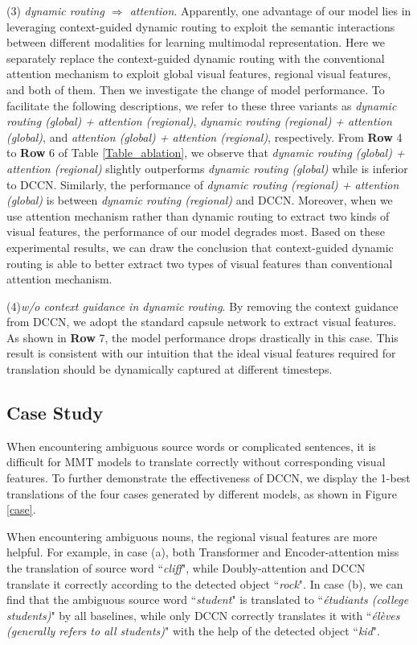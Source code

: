 \documentclass[sigconf]{acmart}
\begin{document}
(3) \emph{dynamic routing $\Rightarrow$ attention}. 
Apparently, one advantage of our model lies in leveraging context-guided dynamic routing to exploit the semantic interactions between different modalities for learning multimodal representation. Here we separately replace the context-guided dynamic routing with the conventional attention mechanism to exploit global visual features, regional visual features, and both of them. Then we investigate the change of model performance. 
To facilitate the following descriptions, we refer to these three variants as 
\emph{dynamic routing (global) + attention (regional)}, 
\emph{dynamic routing (regional) + attention (global)}, 
and \emph{attention (global) + attention (regional)}, respectively. 
From \textbf{Row} 4 to \textbf{Row} 6 of Table \ref{Table_ablation}, 
we observe that \emph{dynamic routing (global) + attention (regional)} slightly outperforms \emph{dynamic routing (global)} while is inferior to DCCN. 
Similarly, the performance of \emph{dynamic routing (regional) + attention (global)} is between \emph{dynamic routing (regional)} and DCCN. 
Moreover, when we use attention mechanism rather than dynamic routing to extract two kinds of visual features, the performance of our model degrades most. 
Based on these experimental results, we can draw the conclusion that context-guided dynamic routing is able to better extract two types of visual features than conventional attention mechanism.


(4)\emph{w/o context guidance in dynamic routing}.
By removing the context guidance from DCCN, we adopt the standard capsule network to extract visual features. 
As shown in \textbf{Row} 7, 
the model performance drops drastically in this case.
This result is consistent with our intuition that the ideal visual features required for translation should be dynamically captured at different timesteps. 




\subsection{Case Study}


When encountering ambiguous source words or complicated sentences, it is difficult for MMT models to translate correctly without corresponding visual features. To further demonstrate the effectiveness of DCCN, we display the 1-best translations of the four cases generated by different models, as shown in Figure \ref{case}.

When encountering ambiguous nouns, the regional visual features are more helpful. For example, in case (a), both Transformer and Encoder-attention miss the translation of source word ``\emph{cliff}", while Doubly-attention and DCCN translate it correctly according to the detected object ``\emph{rock}".
In case (b), we can find that the ambiguous source word ``\emph{student}" is translated to ``\emph{étudiants (college students)}" by all baselines, while only DCCN correctly translates it with ``\emph{élèves (generally refers to all students)}" with the help of the detected object ``\emph{kid}". 
\end{document}
